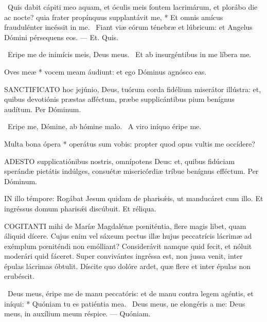 \R\ Quis dabit cápiti meo aquam, et óculis meis fontem lacrimárum, et plorábo die ac nocte? quia frater propínquus supplantávit me, * Et omnis amícus fraudulénter incéssit in me. \V\ Fiant viæ eórum ténebræ et lúbricum: et Angelus Dómini pérsequens eos. --- Et. Quis.

\V\ Eripe me de inimícis meis, Deus meus. \R\ Et ab insurgéntibus in me líbera me.

 Oves meæ * vocem meam áudiunt: et ego Dóminus agnósco eas.


\lettrine[lines=2]{S}{ANCTIFICATO} hoc jejúnio, Deus, tuórum corda fidélium miserátor illústra: et, quibus devotiónis præstas afféctum, præbe supplicántibus pium benígnus audítum. Per Dóminum.

\V\ Eripe me, Dómine, ab hómine malo. \R\ A viro iníquo éripe me.

 Multa bona ópera * operátus sum vobis: propter quod opus vultis me occídere?


\lettrine[lines=2]{A}{DESTO} supplicatiónibus nostris, omnípotens Deus: et, quibus fidúciam sperándæ pietátis indúlges, consuétæ misericórdiæ tríbue benígnus efféctum. Per Dóminum.

\sectionornament




\lettrine[lines=2]{I}{N} illo témpore: Rogábat Jesum quidam de pharisǽis, ut manducáret cum illo. Et ingréssus domum pharisǽi discúbuit. Et réliqua.



\lettrine[lines=2]{C}{OGITANTI} mihi de Maríæ Magdalénæ pœniténtia, flere magis libet, quam áliquid dícere. Cujus enim vel sáxeum pectus illæ hujus peccatrícis lácrimæ ad exémplum pœniténdi non emólliant? Considerávit namque quid fecit, et nóluit moderári quid fáceret. Super convivántes ingréssa est, non jussa venit, inter épulas lácrimas óbtulit. Díscite quo dolóre ardet, quæ flere et inter épulas non erubéscit.

\R\ Deus meus, éripe me de manu peccatóris: et de manu contra legem agéntis, et iníqui: * Quóniam tu es patiéntia mea. \V\ Deus meus, ne elongéris a me: Deus meus, in auxílium meum réspice. --- Quóniam.

